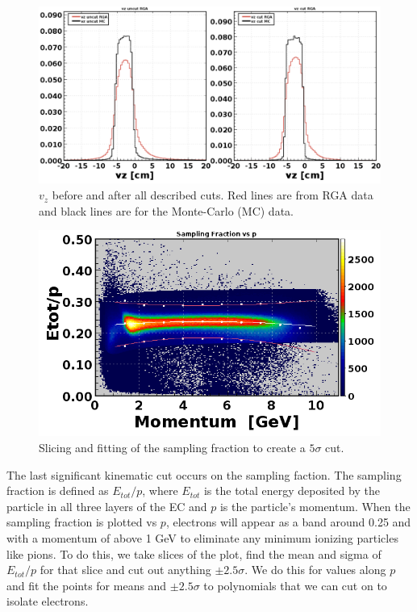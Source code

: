 \begin{figure}[h!]
	\centering
	\includegraphics[width=0.9\linewidth]{figures/rga/vz.png}
	\caption{$v_z$ before and after all described cuts. Red lines are from RGA data and black lines are for the Monte-Carlo (MC) data.}
	\label{fig:rga_vz}
\end{figure}

\begin{figure}[h!]
	\centering
	\includegraphics[width=0.9\linewidth]{figures/rga/fit_etot_p.png}
	\caption{Slicing and fitting of the sampling fraction to create a $5\sigma$ cut.}
	\label{fig:rga_etot_p}
\end{figure}

The last significant kinematic cut occurs on the sampling faction. The sampling fraction is defined as $E_{tot}/p$, where $E_{tot}$ is the total energy deposited by the particle in all three layers of the EC and $p$ is the particle's momentum. When the sampling fraction is plotted vs $p$, electrons will appear as a band around 0.25 and with a momentum of above 1 GeV to eliminate any minimum ionizing particles like pions. To do this, we take slices of the plot, find the mean and sigma of $E_{tot}/p$ for that slice and cut out anything $\pm2.5\sigma$. We do this for values along $p$ and fit the points for means and $\pm2.5\sigma$ to polynomials that we can cut on to isolate electrons.

